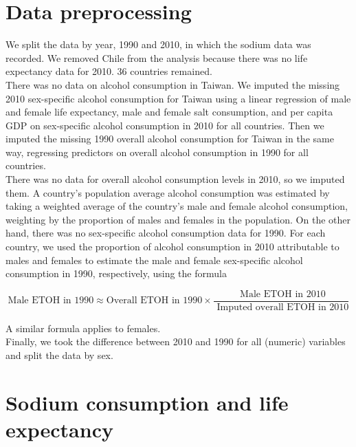 \documentclass{article}
\begin{document}
\let\thefootnote\relax{}


\section{Data preprocessing}
We split the data by year, 1990 and 2010, in which the sodium data was recorded.  We removed Chile from the analysis because there was no life expectancy data for 2010. 36 countries remained.  \\

There was no data on alcohol consumption in Taiwan.  We imputed the missing 2010 sex-specific alcohol consumption for Taiwan using a linear regression of male and female life expectancy, male and female salt consumption, and per capita GDP on sex-specific alcohol consumption in 2010 for all countries. Then we imputed the missing 1990 overall alcohol consumption for Taiwan in the same way, regressing predictors on overall alcohol consumption in 1990 for all countries. \\
 
There was no data for overall alcohol consumption levels in 2010, so we imputed them. A country's population average alcohol consumption was estimated by taking a weighted average of the country's male and female alcohol consumption, weighting by the proportion of males and females in the population.  On the other hand, there was no sex-specific alcohol consumption data for 1990.  For each country, we used the proportion of alcohol consumption in 2010 attributable to males and females to estimate the male and female sex-specific alcohol consumption in 1990, respectively, using the formula

$$\text{Male ETOH in 1990} \approx \text{Overall ETOH in 1990} \times \frac{\text{ Male ETOH in 2010}}{\text{ Imputed overall ETOH in 2010}}$$

\noindent A similar formula applies to females. \\

Finally, we took the difference between 2010 and 1990 for all (numeric) variables and split the data by sex.

\section{Sodium consumption and life expectancy}
\end{document}
